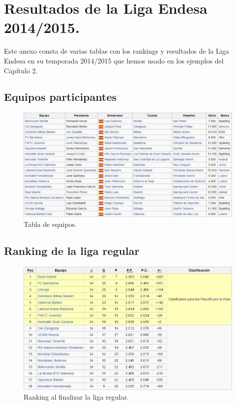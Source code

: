 \chapter{Resultados de la Liga Endesa 2014/2015.}
Este anexo consta de varias tablas con los rankings y resultados de la Liga Endesa en su temporada 2014/2015 que hemos usado en los ejemplos del Capítulo 2.\\

\section*{Equipos participantes}

\begin{figure}[H]
	\centering
	\includegraphics[scale=0.6]{images/equipos.jpg}
	\caption{Tabla de equipos.} 
\end{figure}

\section*{Ranking de la liga regular}

\begin{figure}[H]
	\centering
	\includegraphics[scale=0.7]{images/regular.jpg}
	\caption{Ranking al finalizar la liga regular.} 
\end{figure}


